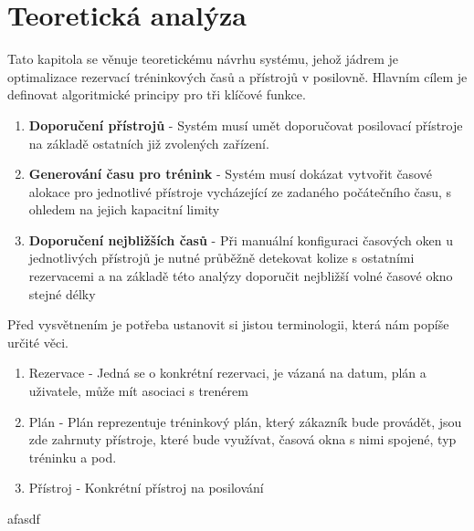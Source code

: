 \chapter{Teoretická analýza}
Tato kapitola se věnuje teoretickému návrhu systému, jehož jádrem je optimalizace rezervací tréninkových časů a přístrojů v posilovně. Hlavním cílem je definovat algoritmické principy pro tři klíčové funkce.

\begin{enumerate}
    \item \textbf{Doporučení přístrojů} - Systém musí umět doporučovat posilovací přístroje na základě ostatních již zvolených zařízení.
    \item \textbf{Generování času pro trénink} - Systém musí dokázat vytvořit časové alokace pro jednotlivé přístroje vycházející ze zadaného počátečního času, s ohledem na jejich kapacitní limity
    \item \textbf{Doporučení nejbližších časů} - Při manuální konfiguraci časových oken u jednotlivých přístrojů je nutné průběžně detekovat kolize s ostatními rezervacemi a na základě této analýzy doporučit nejbližší volné časové okno stejné délky
\end{enumerate}

Před vysvětnením je potřeba ustanovit si jistou terminologii, která nám popíše určité věci.
\begin{enumerate}
    \item Rezervace - Jedná se o konkrétní rezervaci, je vázaná na datum, plán a uživatele, může mít asociaci s trenérem
    \item Plán - Plán reprezentuje tréninkový plán, který zákazník bude provádět, jsou zde zahrnuty přístroje, které bude využívat, časová okna s nimi spojené, typ tréninku a pod.
    \item Přístroj - Konkrétní přístroj na posilování
\end{enumerate}afasdf

